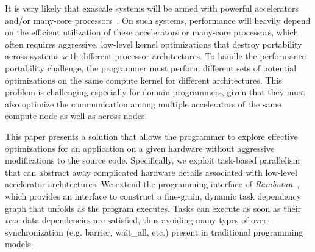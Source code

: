 It is very likely that exascale systems will be armed with powerful accelerators and/or many-core processors~\cite{ASCR/Exascale/Lethin, exascaleRoadMap}.
On such systems, performance will heavily depend on the efficient utilization of these accelerators or many-core processors, which often requires aggressive, low-level kernel optimizations that destroy portability across systems with different processor architectures.
To handle the performance portability challenge, the programmer must perform different sets of potential optimizations on the same compute kernel for different architectures.
This problem is challenging especially for domain programmers, given that they must also optimize the communication among multiple accelerators of the same compute node as well as across nodes.

This paper presents a solution that allows the programmer to explore effective optimizations for an application on a given hardware without aggressive modifications to the source code. 
Specifically, we exploit task-based parallelism that can abstract away complicated hardware details associated with low-level accelerator architectures.
We extend the programming interface of {\em Rambutan}~\cite{rambutanWebsite}, which provides an interface to construct a fine-grain, dynamic task dependency graph that unfolds as the program executes. 
Tasks can execute as soon as their {\em true} data dependencies are satisfied, thus avoiding many types of over-synchronization (e.g. barrier, wait\_all, etc.) present in traditional programming models.

